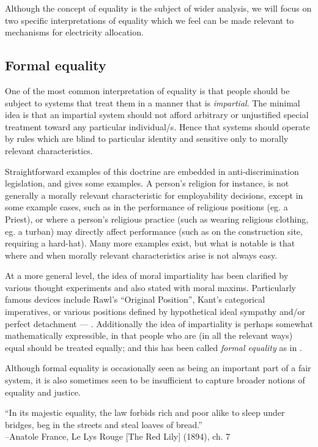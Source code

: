 Although the concept of equality is the subject of wider analysis, we will focus on two specific interpretations of equality which we feel can be made relevant to mechanisms for electricity allocation.

\subsection{Formal equality}\label{sec:formal_equality}

One of the most common interpretation of equality is that people should be subject to systems that treat them in a manner that is \textit{impartial}. The minimal idea is that an impartial system should not afford arbitrary or unjustified special treatment toward any particular individual/s. Hence that systems should operate by rules which are blind to particular identity and sensitive only to morally relevant characteristics.

Straightforward examples of this doctrine are embedded in anti-discrimination legislation, and \cite{mason2006levelling} gives some examples.  A person's religion for instance, is not generally a morally relevant characteristic for employability decisions, except in some example cases, such as in the performance of religious positions (eg. a Priest), or where a person's religious practice (such as wearing religious clothing, eg. a turban) may directly affect performance (such as on the construction site, requiring a hard-hat).
Many more examples exist, but what is notable is that where and when morally relevant characteristics arise is not always easy.

At a more general level, the idea of moral impartiality has been clarified by various thought experiments and also stated with moral maxims.
Particularly famous devices include Rawl's ``Original Position'', Kant's categorical imperatives, or various positions defined by hypothetical ideal sympathy and/or perfect detachment --- \cite{smithGutenberg, nla.cat-vn197822,10.2307/2103988}.
Additionally the idea of impartiality is perhaps somewhat mathematically expressible, in that people who are (in all the relevant ways) equal should be treated equally; and this has been called \textit{formal equality} as in \citep{whatisbasicequalitynathan}.

Although formal equality is occasionally seen as being an important part of a fair system, it is also sometimes seen to be insufficient to capture broader notions of equality and justice.

\begin{displayquote}
``In its majestic equality, the law forbids rich and poor alike to sleep under bridges, beg in the streets and steal loaves of bread.''\\
--Anatole France, Le Lys Rouge [The Red Lily] (1894), ch. 7
\end{displayquote}

